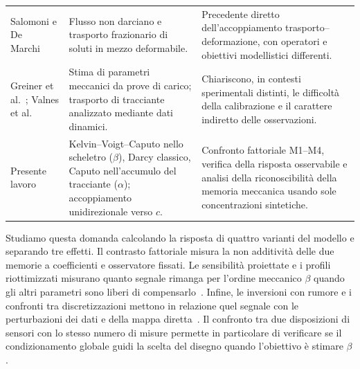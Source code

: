 \begin{table}[H]
\begin{tabularx}{\textwidth}{@{}>{\raggedright\arraybackslash}p{}>{\raggedright\arraybackslash}p{}>{\raggedright\arraybackslash}X@{}}
Salomoni e De Marchi~\citep{salomoni2022fractional} & Flusso non darciano e trasporto frazionario di soluti in mezzo deformabile. & Precedente diretto dell'accoppiamento trasporto--deformazione, con operatori e obiettivi modellistici differenti.\\
Greiner et al.~\citep{greiner2024modeldriven}; Valnes et al.~\citep{valnes2020apparent} & Stima di parametri meccanici da prove di carico; trasporto di tracciante analizzato mediante dati dinamici. & Chiariscono, in contesti sperimentali distinti, le difficoltà della calibrazione e il carattere indiretto delle osservazioni.\\
Presente lavoro & Kelvin--Voigt--Caputo nello scheletro ($\beta$), Darcy classico, Caputo nell'accumulo del tracciante ($\alpha$); accoppiamento unidirezionale verso $c$. & Confronto fattoriale M1--M4, verifica della risposta osservabile e analisi della riconoscibilità della memoria meccanica usando sole concentrazioni sintetiche.\\
\bottomrule
\end{tabularx}
\end{table}

Studiamo questa domanda calcolando la risposta di quattro varianti del modello e separando tre effetti. Il contrasto fattoriale misura la non additività delle due memorie a coefficienti e osservatore fissati. Le sensibilità proiettate e i profili riottimizzati misurano quanto segnale rimanga per l'ordine meccanico $\beta$ quando gli altri parametri sono liberi di compensarlo~\citep{pukelsheim2006optimal,raue2009structural,jin2015tutorial}. Infine, le inversioni con rumore e i confronti tra discretizzazioni mettono in relazione quel segnale con le perturbazioni dei dati e della mappa diretta~\citep{kaipio2007discretization}. Il confronto tra due disposizioni di sensori con lo stesso numero di misure permette in particolare di verificare se il condizionamento globale guidi la scelta del disegno quando l'obiettivo è stimare $\beta$.
